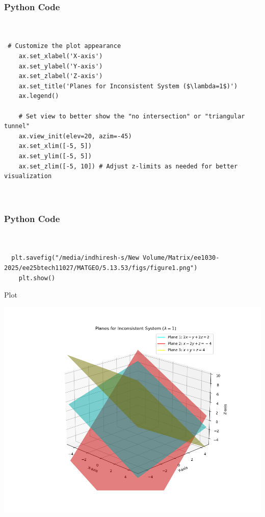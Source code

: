 \documentclass{beamer}
\begin{document}
    \begin{frame}[fragile]
        \frametitle{Python Code}
        \begin{lstlisting}
  

 # Customize the plot appearance
    ax.set_xlabel('X-axis')
    ax.set_ylabel('Y-axis')
    ax.set_zlabel('Z-axis')
    ax.set_title('Planes for Inconsistent System ($\lambda=1$)')
    ax.legend()
    
    # Set view to better show the "no intersection" or "triangular tunnel"
    ax.view_init(elev=20, azim=-45) 
    ax.set_xlim([-5, 5])
    ax.set_ylim([-5, 5])
    ax.set_zlim([-5, 10]) # Adjust z-limits as needed for better visualization

  
        \end{lstlisting}
    \end{frame}

     \begin{frame}[fragile]
        \frametitle{Python Code}
        \begin{lstlisting}
  

  plt.savefig("/media/indhiresh-s/New Volume/Matrix/ee1030-2025/ee25btech11027/MATGEO/5.13.53/figs/figure1.png")
    plt.show()
        \end{lstlisting}
    \end{frame}
    
    \begin{frame}{Plot}
        \begin{center}
            \includegraphics[width=\columnwidth, height=0.8\textheight, keepaspectratio]{figs/figure1.png}
        \end{center}
    \end{frame}
    
    
\end{document}
